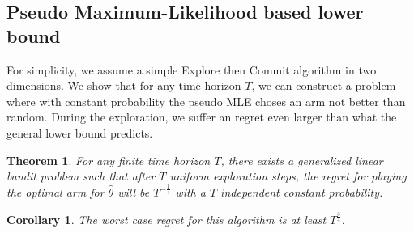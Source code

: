\documentclass[twoside]{article} \usepackage{aistats2017}
\newtheorem{theorem}{Theorem}
\newtheorem{corollary}{Corollary}[theorem]
\begin{document}
\subsection{Pseudo Maximum-Likelihood based lower bound}
For simplicity, we assume a simple Explore then Commit algorithm in two dimensions. 
We show that for any time horizon $T$, we can construct a problem where with constant probability the pseudo MLE choses an arm not better than random.
During the exploration, we suffer an regret even larger than what the general lower bound predicts.
\begin{theorem}
For any finite time horizon $T$, there exists a generalized linear bandit problem such that after $T$ uniform exploration steps, the regret for playing the optimal arm for $\hat{\theta}$ will be $T^{-\frac{1}{4}}$ with a $T$ independent constant probability.
\end{theorem}
\begin{corollary}
The worst case regret for this algorithm is at least $T^{\frac{3}{4}}$.
\end{corollary}
\end{document}
